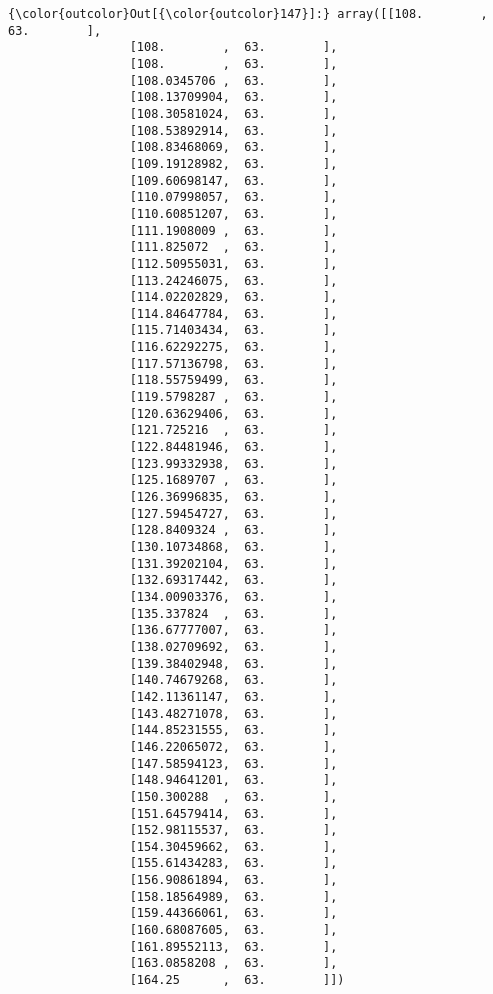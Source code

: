 \documentclass[11pt]{article}
\begin{document}
\begin{Verbatim}[commandchars=\\\{\}]
{\color{outcolor}Out[{\color{outcolor}147}]:} array([[108.        ,  63.        ],
                 [108.        ,  63.        ],
                 [108.        ,  63.        ],
                 [108.0345706 ,  63.        ],
                 [108.13709904,  63.        ],
                 [108.30581024,  63.        ],
                 [108.53892914,  63.        ],
                 [108.83468069,  63.        ],
                 [109.19128982,  63.        ],
                 [109.60698147,  63.        ],
                 [110.07998057,  63.        ],
                 [110.60851207,  63.        ],
                 [111.1908009 ,  63.        ],
                 [111.825072  ,  63.        ],
                 [112.50955031,  63.        ],
                 [113.24246075,  63.        ],
                 [114.02202829,  63.        ],
                 [114.84647784,  63.        ],
                 [115.71403434,  63.        ],
                 [116.62292275,  63.        ],
                 [117.57136798,  63.        ],
                 [118.55759499,  63.        ],
                 [119.5798287 ,  63.        ],
                 [120.63629406,  63.        ],
                 [121.725216  ,  63.        ],
                 [122.84481946,  63.        ],
                 [123.99332938,  63.        ],
                 [125.1689707 ,  63.        ],
                 [126.36996835,  63.        ],
                 [127.59454727,  63.        ],
                 [128.8409324 ,  63.        ],
                 [130.10734868,  63.        ],
                 [131.39202104,  63.        ],
                 [132.69317442,  63.        ],
                 [134.00903376,  63.        ],
                 [135.337824  ,  63.        ],
                 [136.67777007,  63.        ],
                 [138.02709692,  63.        ],
                 [139.38402948,  63.        ],
                 [140.74679268,  63.        ],
                 [142.11361147,  63.        ],
                 [143.48271078,  63.        ],
                 [144.85231555,  63.        ],
                 [146.22065072,  63.        ],
                 [147.58594123,  63.        ],
                 [148.94641201,  63.        ],
                 [150.300288  ,  63.        ],
                 [151.64579414,  63.        ],
                 [152.98115537,  63.        ],
                 [154.30459662,  63.        ],
                 [155.61434283,  63.        ],
                 [156.90861894,  63.        ],
                 [158.18564989,  63.        ],
                 [159.44366061,  63.        ],
                 [160.68087605,  63.        ],
                 [161.89552113,  63.        ],
                 [163.0858208 ,  63.        ],
                 [164.25      ,  63.        ]])
\end{Verbatim}
            
\end{document}
